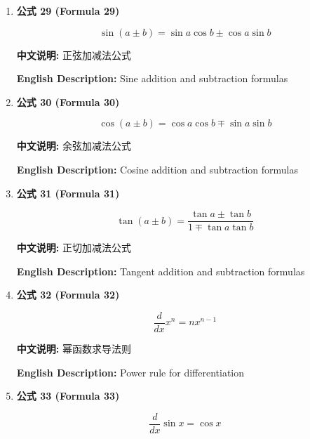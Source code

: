 \documentclass[12pt,a4paper]{article}
\begin{document}
\begin{enumerate}[leftmargin=*]
\item \textbf{公式 29 (Formula 29)}

\begin{equation}
\sin(a \pm b) = \sin a \cos b \pm \cos a \sin b
\end{equation}

\textbf{中文说明:} 正弦加减法公式

\textbf{English Description:} Sine addition and subtraction formulas

\vspace{0.5cm}

\item \textbf{公式 30 (Formula 30)}

\begin{equation}
\cos(a \pm b) = \cos a \cos b \mp \sin a \sin b
\end{equation}

\textbf{中文说明:} 余弦加减法公式

\textbf{English Description:} Cosine addition and subtraction formulas

\vspace{0.5cm}

\item \textbf{公式 31 (Formula 31)}

\begin{equation}
\tan(a \pm b) = \frac{\tan a \pm \tan b}{1 \mp \tan a \tan b}
\end{equation}

\textbf{中文说明:} 正切加减法公式

\textbf{English Description:} Tangent addition and subtraction formulas

\vspace{0.5cm}

\item \textbf{公式 32 (Formula 32)}

\begin{equation}
\frac{d}{dx}x^n = nx^{n-1}
\end{equation}

\textbf{中文说明:} 幂函数求导法则

\textbf{English Description:} Power rule for differentiation

\vspace{0.5cm}

\item \textbf{公式 33 (Formula 33)}

\begin{equation}
\frac{d}{dx}\sin x = \cos x
\end{equation}


\end{enumerate}
\end{document}
